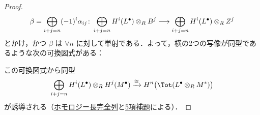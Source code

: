 \documentclass[algtopo_main]{subfiles}
\begin{document}
\begin{proof}
\begin{align}
        \beta = \bigoplus_{i+j = n} (-1)^i \alpha_{ij} \colon \bigoplus_{i+j = n} H^i(L^\bullet) \otimes_R B^{j} \longrightarrow \bigoplus_{i+j = n} H^i(L^\bullet) \otimes_R Z^{j}
    \end{align}
    とかけ，かつ $\beta$ は $\forall n$ に対して単射である．よって，横の2つの写像が同型であるような次の可換図式がある：
    \begin{center}
    \end{center}
    この可換図式から同型
    \begin{align}
        \bigoplus_{i+j = n} H^i(L^\bullet) \otimes_R H^j(M^\bullet) \xrightarrow{\cong} H^n \bigl( \Tot(L^\bullet \otimes_R M^*) \bigr) 
    \end{align}
    が誘導される（\hyperref[prop:HES]{ホモロジー長完全列}と\hyperref[prop:five-lemma]{5項補題}による）．
\end{proof}
\end{document}
